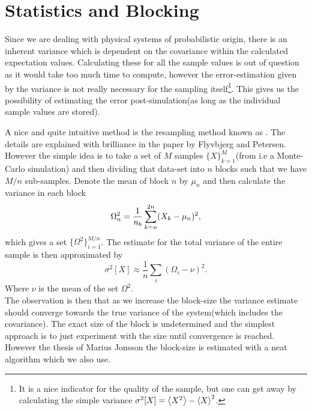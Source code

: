 \section{Statistics and Blocking}
    Since we are dealing with physical systems of probabilistic origin, there
    is an inherent variance which is dependent on the covariance within the
    calculated expectation values. Calculating these for all the sample values
    is out of question as it would take too much time to compute, however the
    error-estimation given by the variance is not really necessary for the
    sampling itself\footnote{It is a nice indicator for the quality of the
    sample, but one can get away by calculating the simple variance
    $\sigma^2[X]=\ecp{X^2} - \ecp{X}^2$.}. This gives us the possibility of
    estimating the error post-simulation(as long as the individual sample
    values are stored).

    A nice and quite intuitive method is the resampling method known as
    . The details are explained with brilliance in the paper
    \cite{blocking} by Flyvbjerg and Petersen. However the simple idea is to
    take a set of $M$ samples $\{X\}^M_{k=1}$(from i.e a Monte-Carlo
    simulation) and then dividing that data-set into $n$ blocks such that we
    have $M/n$ sub-samples. Denote the mean of block $n$ by $\mu_n$ and then
    calculate the variance in each block
        \begin{equation}
            \Omega^2_n = \frac{1}{n_b}\suml{k=n}{2n} (X_k - \mu_n)^2,
        \end{equation}
    which gives a set $\{\Omega^2\}^{M/n}_{i=1}$. The estimate for the total
    variance of the entire sample is then approximated by
        \begin{equation}
            \sigma^2[X] \approx \frac{1}{n} \sum_i (\Omega_i - \nu)^2.
        \end{equation}
    Where $\nu$ is the mean of the set $\Omega^2$. \\
    The observation is then that as we increase the block-size the variance
    estimate should converge towards the true variance of the system(which
    includes the covariance). The exact size of the block is undetermined and
    the simplest approach is to just experiment with the size until convergence
    is reached. \\
    However the thesis of Marius Jonsson the block-size is estimated with a
    neat algorithm which we also use.


